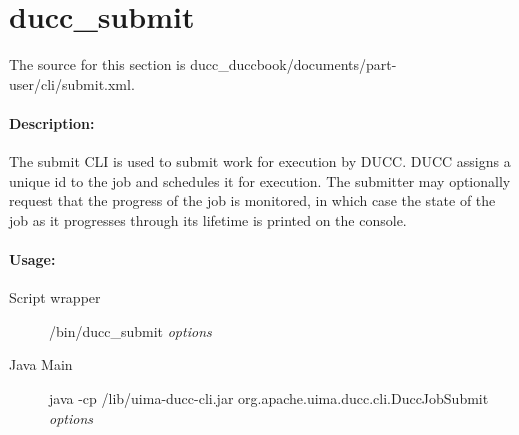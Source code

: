% 
% 
% 
% 
\ifpdf
\else
{}
\fi

    \section{ducc\_submit}
    \label{sec:cli.ducc-submit}
       The source for this section is ducc\_duccbook/documents/part-user/cli/submit.xml.
       \paragraph{Description:}
           The submit CLI is used to submit work for execution by DUCC. DUCC assigns a unique id to the
           job and schedules it for execution. The submitter may optionally request that the progress of
           the job is monitored, in which case the state of the job as it progresses through its
           lifetime is printed on the console.
       \paragraph{Usage:}
           \begin{description}
             \item[Script wrapper] \ducchome/bin/ducc\_submit {\em options}
             \item[Java Main]      java -cp \ducchome/lib/uima-ducc-cli.jar org.apache.uima.ducc.cli.DuccJobSubmit {\em options}
           \end{description}

